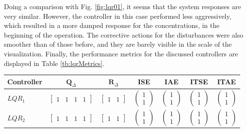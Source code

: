 \documentclass[a4paper,11pt]{book}
\numberwithin{figure}{chapter}
\numberwithin{equation}{chapter}
\numberwithin{table}{chapter}
\theoremstyle{definition}
\begin{document}
Doing a comparison with Fig. \ref{fig:lqr01}, it seems that the system responses are very similar. However, the controller in this case performed less aggressively, which resulted in a more damped response for the concentrations, in the beginning of the operation. The corrective actions for the disturbances were also smoother than of those before, and they are barely visible in the scale of the visualization. Finally, the performance metrics for the discussed controllers are displayed in Table \ref{tb:lqrMetrics}.

\begin{table}[ht]
	\centering
	\begin{tabular}{l | c c | c c c c}
		\textbf{Controller} & $\bm{Q}_{\Delta}$ & $\bm{R}_{\Delta}$ & \textbf{ISE} & \textbf{IAE} & \textbf{ITSE} & \textbf{ITAE} \\
		\hline
		$LQR_1$ & $\begin{bmatrix} 1 & 1 & 1 & 1 \end{bmatrix}$ & $\begin{bmatrix} 1 & 1 \end{bmatrix}$ & $\begin{pmatrix} 1 \\ 1 \end{pmatrix}$ & $\begin{pmatrix} 1 \\ 1 \end{pmatrix}$	& $\begin{pmatrix} 1 \\ 1 \end{pmatrix}$ & $\begin{pmatrix} 1 \\ 1 \end{pmatrix}$ \\
		$LQR_2$ & $\begin{bmatrix} 1 & 1 & 1 & 1 \end{bmatrix}$ & $\begin{bmatrix} 1 & 1 \end{bmatrix}$ & $\begin{pmatrix} 1 \\ 1 \end{pmatrix}$ & $\begin{pmatrix} 1 \\ 1 \end{pmatrix}$	& $\begin{pmatrix} 1 \\ 1 \end{pmatrix}$ & $\begin{pmatrix} 1 \\ 1 \end{pmatrix}$ \\

\end{tabular}
\end{table}
\end{document}
